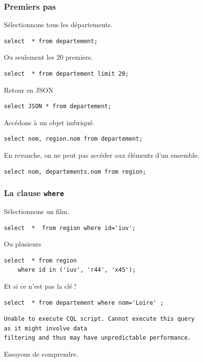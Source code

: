 \begin{frame}[fragile] \frametitle{Premiers pas}

Sélectionnons tous les départements.

\begin{verbatim}
select  * from departement;
\end{verbatim}

\vfill

Ou seulement les 20 premiers.
\begin{verbatim}
select  * from departement limit 20;
\end{verbatim}

\vfill
Retour en JSON
\begin{verbatim}
select JSON * from departement;
\end{verbatim}

\vfill
Accédons à un objet imbriqué.
\begin{verbatim}
select nom, region.nom from departement;
\end{verbatim}

\vfill
En revanche, on ne peut pas accéder aux éléments d'un ensemble.
\begin{verbatim}
select nom, departements.nom from region;
\end{verbatim}
\end{frame}

\begin{frame}[fragile] \frametitle{La clause \texttt{where}}

Sélectionnons un film.

\begin{verbatim}
select  *  from region where id='iuv';
\end{verbatim}

Ou plusieurs

\begin{verbatim}
select  * from region 
    where id in ('iuv', 'r44', 'x45');
\end{verbatim}
 
Et si ce n'est pas la clé\,?

\begin{verbatim}
select  * from departement where nom='Loire' ;
\end{verbatim}

\begin{verbatim}
Unable to execute CQL script. Cannot execute this query 
as it might involve data
filtering and thus may have unpredictable performance. 
\end{verbatim}

Essayons de comprendre.
\end{frame}

